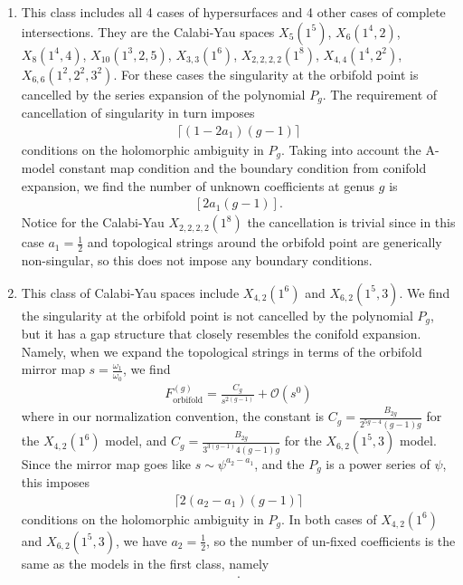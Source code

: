 \documentclass[12pt]{article}
\begin{document}
\begin{enumerate}
\item This class includes all 4 cases of hypersurfaces and 4 other cases of complete intersections.
They are the Calabi-Yau spaces $X_5(1^5)$, $X_6(1^4,2)$,
$X_8(1^4,4)$, $X_{10}(1^3,2,5)$, $X_{3,3}(1^6)$,
$X_{2,2,2,2}(1^8)$, $X_{4,4}(1^4,2^2)$, $X_{6,6}(1^2,2^2,3^2)$.
For these cases the singularity at the orbifold point is cancelled
by the series expansion of the polynomial $P_g$. The requirement
of cancellation of singularity in turn imposes
\begin{eqnarray}
\lceil(1-2a_1)(g-1)\rceil
\end{eqnarray}
conditions on the holomorphic ambiguity in $P_g$. Taking into
account the A-model constant map condition and the boundary
condition from conifold expansion, we find the number of unknown
coefficients at genus $g$ is
\begin{eqnarray} \label{number1-10-28}
[2a_1(g-1)].
\end{eqnarray}
Notice for the Calabi-Yau $X_{2,2,2,2}(1^8)$ the cancellation is
trivial since in this case $a_1=\frac{1}{2}$ and topological
strings around the orbifold point are generically non-singular, so
this does not impose any boundary conditions.


\item This class of Calabi-Yau spaces include $X_{4,2}(1^6)$ and
$X_{6,2}(1^5,3)$. We find the singularity at the orbifold point is
not cancelled by the polynomial $P_g$, but it has a gap structure
that closely resembles the conifold expansion. Namely, when we
expand the topological strings in terms of the orbifold mirror map
$s=\frac{\omega_1}{\omega_0}$, we find
\begin{eqnarray}
F^{(g)}_{\textrm{orbifold}}=\frac{C_g}{s^{2(g-1)}}+\mathcal{O}(s^0)
\end{eqnarray}
where in our normalization convention, the constant is
$C_g=\frac{B_{2g}}{2^{5g-4}(g-1)g}$ for the $X_{4,2}(1^6)$ model,
and $C_g=\frac{B_{2g}}{3^{3(g-1)}4(g-1)g}$ for the
$X_{6,2}(1^5,3)$ model. Since the mirror map goes like
$s\sim \psi^{a_2-a_1}$, and the $P_g$ is a power series of
$\psi$, this imposes
\begin{eqnarray}
\lceil 2(a_2-a_1)(g-1) \rceil
\end{eqnarray}
conditions on the holomorphic ambiguity in $P_g$. In both cases of
$X_{4,2}(1^6)$ and $X_{6,2}(1^5,3)$, we have $a_2=\frac{1}{2}$, so
the number of un-fixed coefficients is the same as the models in
the first class, namely
\begin{eqnarray}
[2a_1(g-1)].
\end{eqnarray}


\end{enumerate}
\end{document}
